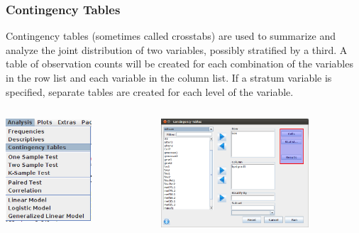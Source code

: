 \documentclass[xcolor={table}]{beamer}
\begin{document}
\begin{frame}\frametitle{Contingency Tables}
Contingency tables (sometimes called crosstabs) are used to summarize and analyze the joint distribution of two variables, possibly stratified by a third. A table of observation counts will be created for each combination of the variables in the row list and each variable in the column list. If a stratum variable is specified, separate tables are created for each level of the variable. 
\begin{columns}
\begin{column}{0.4\textwidth}
\includegraphics[width=3.2cm]{conting1.png}
\end{column}
\begin{column}{0.6\textwidth}
\includegraphics[width=5.5cm]{conting2.png}
\end{column}
\end{columns}
\end{frame}
\end{document}
